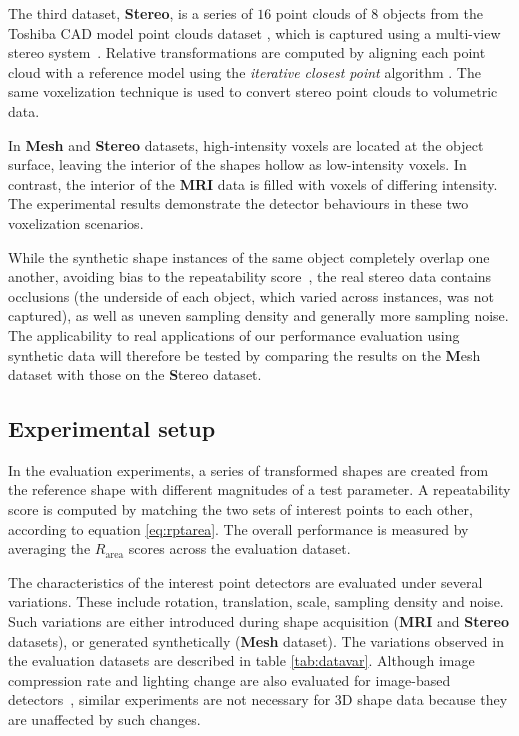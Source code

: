 The third dataset, \textbf{Stereo}, is a series of $16$ point clouds of $8$ objects from the Toshiba CAD model point clouds dataset \cite{Pham2011}, which is captured using a multi-view stereo system~\cite{Vogiatzis2011}.  Relative transformations are computed by aligning each point cloud with a reference model using the \emph{iterative closest point} algorithm \cite{Besl1992}. The same voxelization technique is used to convert stereo point clouds to volumetric data.

In \textbf{Mesh} and \textbf{Stereo} datasets, high-intensity voxels are located at the object surface, leaving the interior of the shapes hollow as low-intensity voxels. In contrast, the interior of the \textbf{MRI} data is filled with voxels of differing intensity. The experimental results demonstrate the detector behaviours in these two voxelization scenarios.

While the synthetic shape instances of the same object completely overlap one another, avoiding bias to the repeatability score~\cite{Willis2009}, the real stereo data contains occlusions (the underside of each object, which varied across instances, was not captured), as well as uneven sampling density and generally more sampling noise. The applicability to real applications of our performance evaluation using synthetic data will therefore be tested by comparing the results on the {\textbf Mesh} dataset with those on the {\textbf Stereo} dataset. 





\subsection{Experimental setup}
\label{sec:variation}
In the evaluation experiments, a series of transformed shapes are created from the reference shape with different magnitudes of a test parameter. A repeatability score is computed by matching the two sets of interest points to each other, according to equation \ref{eq:rptarea}. 
The overall performance is measured by averaging the $R_{\textrm{area}}$ scores across the evaluation dataset. 

The characteristics of the interest point detectors are evaluated under several variations. 
These include rotation, translation, scale, sampling density and noise. 
Such variations are either introduced during shape acquisition (\textbf{MRI} and \textbf{Stereo} datasets), or generated synthetically (\textbf{Mesh} dataset). The variations observed in the evaluation datasets are described in table \ref{tab:datavar}. Although image compression rate and lighting change are also evaluated for image-based detectors~\cite{Mikolajczyk2005}, similar experiments are not necessary for 3D shape data because they are unaffected by such changes. 

